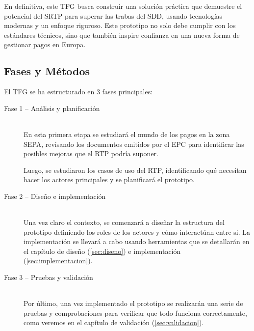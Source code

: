 En definitiva, este TFG busca construir una solución práctica que demuestre el potencial del SRTP para superar las trabas del SDD, usando tecnologías modernas y un enfoque riguroso. Este prototipo no solo debe cumplir con los estándares técnicos, sino que también inspire confianza en una nueva forma de gestionar pagos en Europa.

\subsection{Fases y Métodos}
\label{subsec:FasesMetodos}
El TFG se ha estructurado en 3 fases principales:

\begin{description}
  \item[Fase 1 – Análisis y planificación]\\
      En esta primera etapa se estudiará el mundo de los pagos en la zona SEPA, revisando los documentos emitidos por el EPC \cite{EPC_official} para identificar las posibles mejoras que el RTP podría suponer.
      
      Luego, se estudiaron los casos de uso del RTP, identificando qué necesitan hacer los actores principales y se planificará el prototipo.
  \item[Fase 2 – Diseño e implementación]\\
      Una vez claro el contexto, se comenzará a diseñar la estructura del prototipo definiendo los roles de los actores y cómo interactúan entre si.
      La implementación se llevará a cabo usando herramientas que se detallarán en el capítulo de diseño (\ref{sec:diseno}) e implementación (\ref{sec:implementacion}).
  \item[Fase 3 – Pruebas y validación]\\
      Por último, una vez implementado el prototipo se realizarán una serie de pruebas y comprobaciones para verificar que todo funciona correctamente, como veremos en el capítulo de validación (\ref{sec:validacion}).
\end{description}

